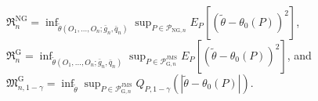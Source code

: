 \(\mathfrak R_n^{\mathrm{NG}}=\inf_{\widetilde\theta(O_1,\ldots,O_n;\bar g_n,\bar q_n)}\sup_{P\in\mathcal P_{\mathrm{NG},n}}E_P[(\widetilde\theta-\theta_0(P))^2]\), \(\mathfrak R_n^{\mathrm G}=\inf_{\widetilde\theta(O_1,\ldots,O_n;\bar g_n,\bar q_n)}\sup_{P\in\mathcal P_{\mathrm G,n}^{\mathrm{JMS}}}E_P[(\widetilde\theta-\theta_0(P))^2]\), and \(\mathfrak M_{n,1-\gamma}^{\mathrm G}=\inf_{\widetilde\theta}\sup_{P\in\mathcal P_{\mathrm G,n}^{\mathrm{JMS}}}Q_{P,1-\gamma}(|\widetilde\theta-\theta_0(P)|)\).